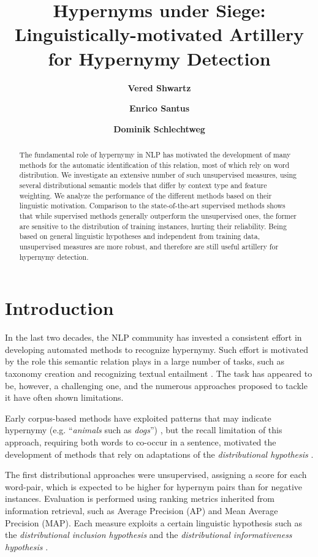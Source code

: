 \documentclass[11pt]{article}
\title{Hypernyms under Siege:\\Linguistically-motivated Artillery for Hypernymy Detection}
\author[1]{\bf Vered Shwartz}
\author[2,3]{\bf Enrico Santus}
\author[4]{\bf Dominik Schlechtweg}
\affil[1]{Bar-Ilan University\\Ramat-Gan, Israel}
\affil[2]{Singapore University of Technology and Design\\Singapore}
\affil[3]{The Hong Kong Polytechnic University\\Hong Kong}
\affil[4]{University of Stuttgart\\Stuttgart, Germany}
\affil[  ]{\mediumfont\tt  \{vered1986,esantus\}@gmail.com,~~dominik.schlechtweg@gmx.de}
\begin{document}
\maketitle

\begin{abstract}
The fundamental role of hypernymy in NLP has motivated the development of many methods for the automatic identification of this relation, most of which rely on word distribution. 
We investigate an extensive number of such unsupervised measures, using several distributional semantic models that differ by context type and feature weighting. We analyze the performance of the different methods based on their linguistic motivation.
Comparison to the state-of-the-art supervised methods shows that while supervised methods generally outperform the unsupervised ones, the former are sensitive to the distribution of training instances, hurting their reliability. Being based on general linguistic hypotheses and independent from training data, unsupervised measures are more robust, and therefore are still useful artillery for hypernymy detection.
\end{abstract}

\section{Introduction} 

In the last two decades, the NLP community has invested a consistent effort in developing automated methods to recognize hypernymy. Such effort is motivated by the role this semantic relation plays in a large number of tasks, such as taxonomy creation \cite{snow2006semantic,navigli2011graph} and recognizing textual entailment \cite{dagan2013recognizing}. The task has appeared to be, however, a challenging one, and the numerous approaches proposed to tackle it have often shown limitations.

Early corpus-based methods have exploited patterns that may indicate hypernymy (e.g. ``\emph{animals} such as \emph{dogs}'') \cite{hearst1992automatic,snow2004learning}, but the recall limitation of this approach, requiring both words to co-occur in a sentence, motivated the development of methods that rely on adaptations of the \emph{distributional hypothesis} \cite{harris1954distributional}. 

The first distributional approaches were unsupervised, assigning a score for each  word-pair, which is expected to be higher for hypernym pairs than for negative instances. Evaluation is performed using ranking metrics inherited from information retrieval, such as Average Precision (AP) and Mean Average Precision (MAP). Each measure exploits a certain linguistic hypothesis such as the \emph{distributional inclusion hypothesis} \cite{weeds2003general,kotlerman2010directional} and the \emph{distributional informativeness hypothesis} \cite{santus2014chasing,rimell2014distributional}. 
\end{document}
